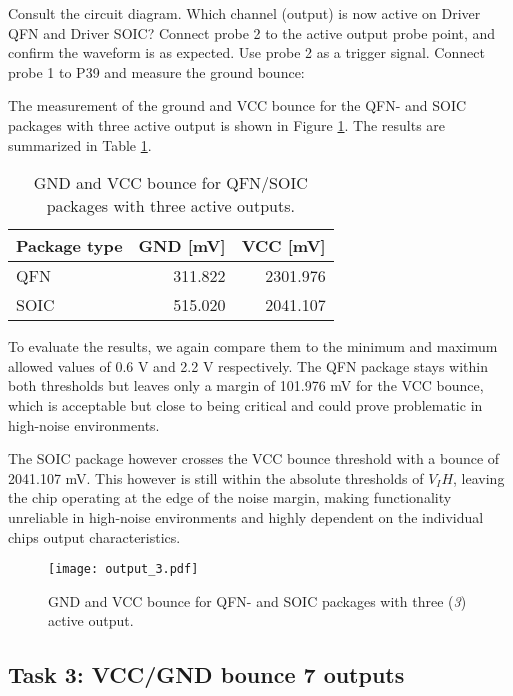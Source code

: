 \documentclass[../main.tex]{subfiles}
\begin{document}
Consult the circuit diagram. Which channel (output) is now active on Driver QFN and Driver SOIC? Connect probe 2 to the active output probe point, and confirm the waveform is as expected. Use probe 2 as a trigger signal. Connect probe 1 to P39 and measure the ground bounce:

\solution

The measurement of the ground and VCC bounce for the QFN- and SOIC packages with three active output is shown in Figure \ref{fig:gnd_vcc_output_3}. The results are summarized in Table \ref{tab:output_3}.

\begin{table}[h]
    \centering
    \begin{tabular}{l | r r}
        \toprule[1pt]
        Package type    & GND [mV]  & VCC [mV]\\
        \midrule
        QFN             & 311.822   & 2301.976  \\
        SOIC            & 515.020   & 2041.107  \\
        \bottomrule[1pt]
    \end{tabular}
    \caption{GND and VCC bounce for QFN/SOIC packages with three active outputs.}
    \label{tab:output_3}
\end{table}

To evaluate the results, we again compare them to the minimum and maximum allowed values of 0.6 V and 2.2 V respectively. The QFN package stays within both thresholds but leaves only a margin of 101.976 mV for the VCC bounce, which is acceptable but close to being critical and could prove problematic in high-noise environments.

\vspace{10pt}
The SOIC package however crosses the VCC bounce threshold with a bounce of 2041.107 mV. This however is still within the absolute thresholds of $V_IH$, leaving the chip operating at the edge of the noise margin, making functionality unreliable in high-noise environments and highly dependent on the individual chips output characteristics.

\newpage

\begin{figure}[h]
    \centering
    \texttt{[image: output\_3.pdf]}
    \caption{GND and VCC bounce for QFN- and SOIC packages with three (\textit{3}) active output.}
    \label{fig:gnd_vcc_output_3}
\end{figure}

\subsection{Task 3: VCC/GND bounce 7 outputs}
\end{document}
